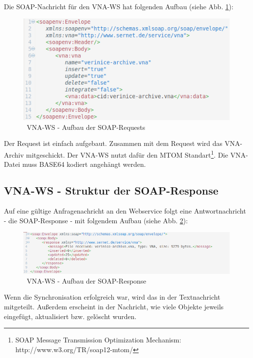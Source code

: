 \documentclass[a4paper,10pt]{book}
\begin{document}
Die SOAP-Nachricht für den VNA-WS hat folgenden Aufbau (siehe
Abb.
\ref{fig:vna-ws-aufbau-der-soap-requests}):
\begin{figure}[htb!]
  \centering
  \includegraphics[scale=.7]{Screenshot/VNA-WS-request.png}
  \caption{\label{fig:vna-ws-aufbau-der-soap-requests} \ VNA-WS -
    Aufbau der SOAP-Requests}
\end{figure}
Der Request ist einfach aufgebaut. Zusammen mit dem Request wird das
VNA-Archiv mitgeschickt. Der VNA-WS nutzt dafür den MTOM
Standart\footnote{SOAP Message Transmission Optimization Mechanism:
  http://www.w3.org/TR/soap12-mtom/}. Die VNA-Datei muss BASE64
kodiert angehängt werden.

\subsection{VNA-WS - Struktur der SOAP-Response}
Auf eine gültige Anfragenachricht an den Webservice folgt eine Antwortnachricht - die SOAP-Response - mit
folgendem Aufbau (siehe Abb. \ref{VNA-WS - Aufbau der SOAP-Response}):
\begin{figure}[htb!]
  \centering
  \includegraphics[scale=.7]{Screenshot/VNA-WS-response.png}
  \caption{\label{VNA-WS - Aufbau der SOAP-Response} \ VNA-WS - Aufbau der SOAP-Response}
\end{figure}
\newline
Wenn die Synchronisation erfolgreich war, wird das in der Textnachricht mitgeteilt. Außerdem erscheint in der Nachricht, wie viele Objekte jeweils eingefügt, aktualisiert bzw. gelöscht wurden.
\end{document}
